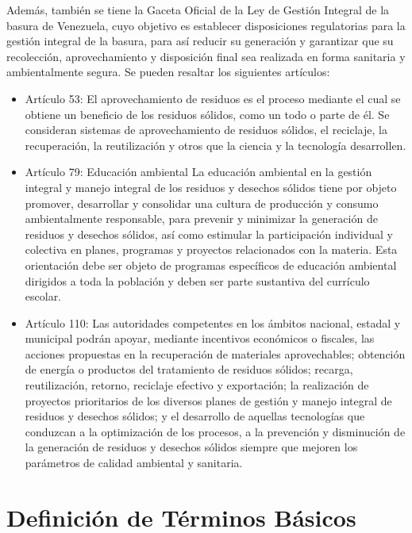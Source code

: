 Además, también se tiene la Gaceta Oficial de la Ley de Gestión Integral de la basura de Venezuela, cuyo objetivo es establecer disposiciones regulatorias para la gestión integral de la basura, para así reducir su generación y garantizar que su recolección, aprovechamiento y disposición final sea realizada en forma sanitaria y ambientalmente segura. Se pueden resaltar los siguientes artículos:

\begin{itemize}
    \item Artículo 53: El aprovechamiento de residuos es el proceso mediante el cual se obtiene un beneficio de los residuos sólidos, como un todo o parte de él. Se consideran sistemas de aprovechamiento de residuos sólidos, el reciclaje, la recuperación, la reutilización y otros que la ciencia y la tecnología desarrollen.
    
    \item Artículo 79: Educación ambiental La educación ambiental en la gestión integral y manejo integral de los residuos y desechos sólidos tiene por objeto promover, desarrollar y consolidar una cultura de producción y consumo ambientalmente responsable, para prevenir y minimizar la generación de residuos y desechos sólidos, así como estimular la participación individual y colectiva en planes, programas y proyectos relacionados con la materia. Esta orientación debe ser objeto de programas específicos de educación ambiental dirigidos a toda la población y deben ser parte sustantiva del currículo escolar.
    
    \item Artículo 110: Las autoridades competentes en los ámbitos nacional, estadal y municipal podrán apoyar, mediante incentivos económicos o fiscales, las acciones propuestas en la recuperación de materiales aprovechables; obtención de energía o productos del tratamiento de residuos sólidos; recarga, reutilización, retorno, reciclaje efectivo y exportación; la realización de proyectos prioritarios de los diversos planes de gestión y manejo integral de residuos y desechos sólidos; y el desarrollo de aquellas tecnologías que conduzcan a la optimización de los procesos, a la prevención y disminución de la generación de residuos y desechos sólidos siempre que mejoren los parámetros de calidad ambiental y sanitaria.
\end{itemize}

\newpage

\section{Definición de Términos Básicos}

